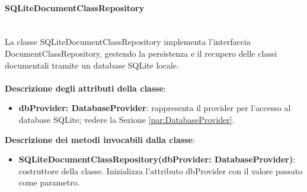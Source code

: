 \documentclass[a4paper,12pt]{article}
\begin{document}
{{{                \paragraph{SQLiteDocumentClassRepository}\label{par:SQLiteDocumentClassRepository}\mbox{}\\
                La classe SQLiteDocumentClassRepository implementa l'interfaccia DocumentClassRepository, gestendo la persistenza e il recupero delle classi documentali tramite un database SQLite locale.\\
                \\
                \textbf{Descrizione degli attributi della classe}:
                \begin{itemize}
                    \item \textbf{dbProvider: DatabaseProvider}: rappresenta il provider per l'accesso al database SQLite; vedere la Sezione \ref{par:DatabaseProvider}.
                \end{itemize}
 
              \noindent \textbf{Descrizione dei metodi invocabili dalla classe}:
                \begin{itemize}
                    \item \textbf{SQLiteDocumentClassRepository(dbProvider: DatabaseProvider)}: costruttore della classe. Inizializza l'attributo dbProvider con il valore passato come parametro.
                \end{itemize}

}}}
\end{document}
